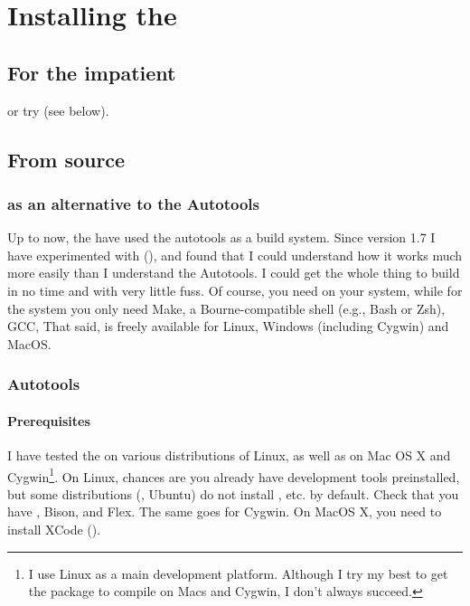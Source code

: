 \chapter[app:installing]{Installing the \nutils}


\section{For the impatient}


or try \cmake{} (see below).



\section{From source}

\subsection{\cmake{} as an alternative to the Autotools}

Up to now, the \nutils{} have used the \gnu{} autotools as a build system. Since
version 1.7 I have experimented with \cmake{} (), and found that
I could understand how it works much more easily than I understand the
Autotools. I could get the whole thing to build in no time and with very little
fuss. Of course, you need \cmake{} on your system, while for the \gnu{} system
you only need Make, a Bourne-compatible shell (e.g., Bash or Zsh), GCC, \etc{}
That said, \cmake{} is freely available for Linux, Windows (including Cygwin)
and MacOS.

\subsection{\gnu{} Autotools}

\subsubsection{Prerequisites}

I have tested the \nutils{} on various distributions of Linux, as well as on Mac
OS X and Cygwin\footnote{I use Linux as a main development platform.  Although I
try my best to get the package to compile on Macs and Cygwin, I don't always
succeed.}. On Linux, chances are you already have development tools
preinstalled, but some distributions (\eg, Ubuntu) do not install ,
etc. by default. Check that you have , Bison, and Flex. The same goes
for Cygwin. On MacOS X, you need to install XCode ().

